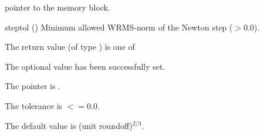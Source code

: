 {{\begin{args}
    pointer to the {\ida} memory block.
  \item[steptol] ()
    Minimum allowed WRMS-norm of the Newton step ($> 0.0$).
  \end{args}
}
{
  The return value  (of type ) is one of
  \begin{args}
  \item[\Id{IDA\_SUCCESS}] 
    The optional value has been successfully set.
  \item[\Id{IDA\_MEM\_NULL}]
    The  pointer is .
  \item[\Id{IDA\_ILL\_INPUT}]
    The  tolerance is  $<= 0.0$.
  \end{args}
}
{
  The default value is (unit roundoff)$^{2/3}$.
}



}
